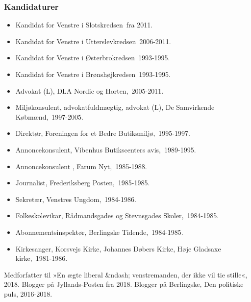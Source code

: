 \documentclass[11pt, a4paper]{awesome-cv}
\begin{document}
\begin{cvletter}
\subsubsection*{Kandidaturer}
\begin{itemize}
\item Kandidat for Venstre i Slotskredsen fra 2011.
\item Kandidat for Venstre i Utterslevkredsen 2006-2011.
\item Kandidat for Venstre i Østerbrokredsen 1993-1995.
\item Kandidat for Venstre i Brønshøjkredsen 1993-1995.
\end{itemize}
\begin{itemize}
\item Advokat (L), DLA Nordic og Horten, 2005-2011.
\item Miljøkonsulent, advokatfuldmægtig, advokat (L), De Samvirkende Købmænd, 1997-2005.
\item Direktør, Foreningen for et Bedre Butiksmiljø, 1995-1997.
\item Annoncekonsulent, Vibenhus Butikscenters avis, 1989-1995.
\item Annoncekonsulent , Farum Nyt, 1985-1988.
\item Journalist, Frederiksberg Posten, 1985-1985.
\item Sekretær, Venstres Ungdom, 1984-1986.
\item Folkeskolevikar, Rådmandsgades og Stevnsgades Skoler, 1984-1985.
\item Abonnementsinspektør, Berlingske Tidende, 1984-1985.
\item Kirkesanger, Korsvejs Kirke, Johannes Døbers Kirke, Høje Gladsaxe kirke, 1981-1986.
\end{itemize}
Medforfatter til »En ægte liberal &ndash; venstremanden, der ikke vil tie stille«, 2018. Blogger på Jyllands-Posten fra 2018. Blogger på Berlingske, Den politiske puls, 2016-2018.

\end{cvletter}
\end{document}
